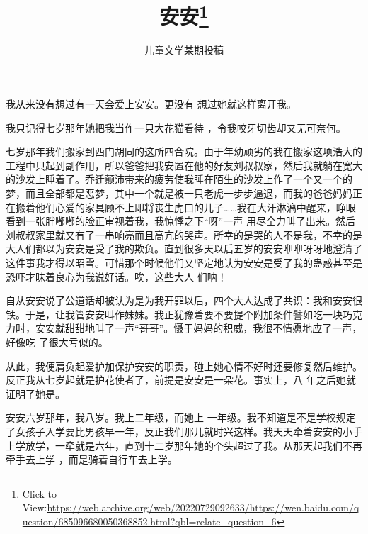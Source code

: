 \documentclass{article}
\title{安安\footnote{Click to View:\url{https://web.archive.org/web/20220729092633/https://wen.baidu.com/question/685096680050368852.html?qbl=relate_question_6}}}
\author{儿童文学某期投稿}
\date{}
\begin{document}

\maketitle


\Large

﻿我从来没有想过有一天会爱上安安。更没有
想过她就这样离开我。 

我只记得七岁那年她把我当作一只大花猫看待
，令我咬牙切齿却又无可奈何。 

七岁那年我们搬家到西门胡同的这所四合院。由于年幼顽劣的我在搬家这项浩大的工程中只起到副作用，所以爸爸把我安置在他的好友刘叔叔家，然后我就躺在宽大的沙发上睡着了。乔迁颠沛带来的疲劳使我睡在陌生的沙发上作了一个又一个的梦，而且全部都是恶梦，其中一个就是被一只老虎一步步逼退，而我的爸爸妈妈正在搬着他们心爱的家具顾不上即将丧生虎口的儿子……我在大汗淋漓中醒来，睁眼看到一张胖嘟嘟的脸正审视着我，我惊悸之下“呀”一声
\newpage
用尽全力叫了出来。然后刘叔叔家里就又有了一串响亮而且高亢的哭声。所幸的是哭的人不是我，不幸的是大人们都以为安安是受了我的欺负。直到很多天以后五岁的安安咿咿呀呀地澄清了这件事我才得以昭雪。可惜那个时候他们又坚定地认为安安是受了我的蛊惑甚至是恐吓才昧着良心为我说好话。唉，这些大人
们呐！ 

自从安安说了公道话却被认为是为我开罪以后，四个大人达成了共识：我和安安很铁。于是，让我管安安叫作妹妹。我正犹豫着要不要提个附加条件譬如吃一块巧克力时，安安就甜甜地叫了一声“哥哥”。慑于妈妈的积威，我很不情愿地应了一声，好像吃
了很大亏似的。 

从此，我便肩负起爱护加保护安安的职责，碰上她心情不好时还要修复然后维护。反正我从七岁起就是护花使者了，前提是安安是一朵花。事实上，八
年之后她就证明了她是。 

安安六岁那年，我八岁。我上二年级，而她上
\newpage
一年级。我不知道是不是学校规定了女孩子入学要比男孩早一年，反正我们那儿就时兴这样。我天天牵着安安的小手上学放学，一牵就是六年，直到十二岁那年她的个头超过了我。从那天起我们不再牵手去上学
，而是骑着自行车去上学。 
\end{document}
